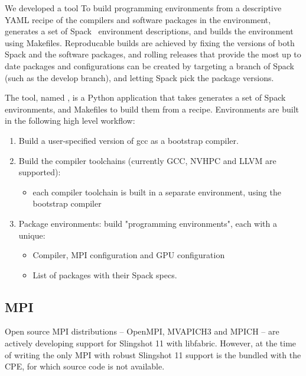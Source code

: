 
We developed a tool To build programming environments from a descriptive YAML recipe of the compilers and software packages in the environment, generates a set of Spack~\cite{gamblin:sc15} environment descriptions, and builds the environment using Makefiles.
Reproducable builds are achieved by fixing the versions of both Spack and the software packages, and rolling releases that provide the most up to date packages and configurations can be created by targeting a branch of Spack (such as the develop branch), and letting Spack pick the package versions.

The tool, named \href{https://github.com/eth-cscs/stackinator}{\stackinator}, is a Python application that takes generates a set of Spack environments, and Makefiles to build them from a recipe.
Environments are built in the following high level workflow:
\begin{enumerate}
    \item Build a user-specified version of gcc as a bootstrap compiler.
    \item Build the compiler toolchains (currently GCC, NVHPC and LLVM are supported):
    \begin{itemize}
        \item each compiler toolchain is built in a separate environment, using the bootstrap compiler
    \end{itemize}
    \item Package environments: build "programming environments", each with a unique:
    \begin{itemize}
        \item Compiler, MPI configuration and GPU configuration
        \item List of packages with their Spack specs.
    \end{itemize}
\end{enumerate}

\subsection{MPI}
Open source MPI distributions -- OpenMPI, MVAPICH3 and MPICH -- are actively developing support for Slingshot 11 with libfabric.
However, at the time of writing the only MPI with robust Slingshot 11 support is the \craympich bundled with the CPE, for which source code is not available.

